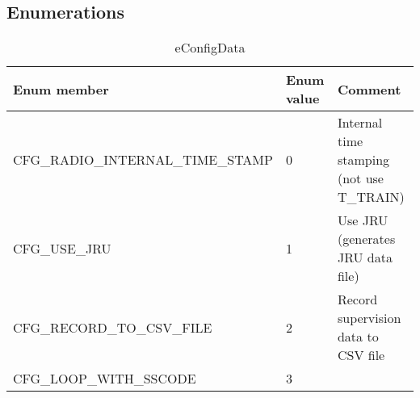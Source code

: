 \documentclass{template/openetcs_article}
\begin{document}
\subsection{Enumerations}
\begin{longtable}{|l|l|l|}
	\caption{eConfigData} \\ 
	\hline
		\begin{minipage}[t]{0.45\linewidth} \textbf{Enum member}	\end{minipage}
	&	\begin{minipage}[t]{0.10\linewidth} \textbf{Enum value}	\end{minipage} 
	&	\begin{minipage}[t]{0.50\linewidth} \textbf{Comment} \end{minipage} \\
	\hline
		\begin{minipage}[t]{0.45\linewidth} CFG\_RADIO\_INTERNAL\_TIME\_STAMP	\end{minipage} 
	&	\begin{minipage}[t]{0.10\linewidth} 0 \end{minipage} 
	&	\begin{minipage}[t]{0.50\linewidth} Internal time stamping (not use T\_TRAIN) \end{minipage}\\
	\hline
		\begin{minipage}[t]{0.45\linewidth} CFG\_USE\_JRU	\end{minipage} 
	&	\begin{minipage}[t]{0.10\linewidth} 1 	\end{minipage} 
	&	\begin{minipage}[t]{0.50\linewidth} Use JRU (generates JRU data file)	\end{minipage} \\
	\hline
		\begin{minipage}[t]{0.45\linewidth} CFG\_RECORD\_TO\_CSV\_FILE	\end{minipage} 
	&	\begin{minipage}[t]{0.10\linewidth} 2 \end{minipage} 
	&	\begin{minipage}[t]{0.50\linewidth} Record supervision data to CSV file \end{minipage} \\
	\hline
		\begin{minipage}[t]{0.45\linewidth} CFG\_LOOP\_WITH\_SSCODE	\end{minipage} 
	&	\begin{minipage}[t]{0.10\linewidth} 3	\end{minipage} 

\end{longtable}
\end{document}
